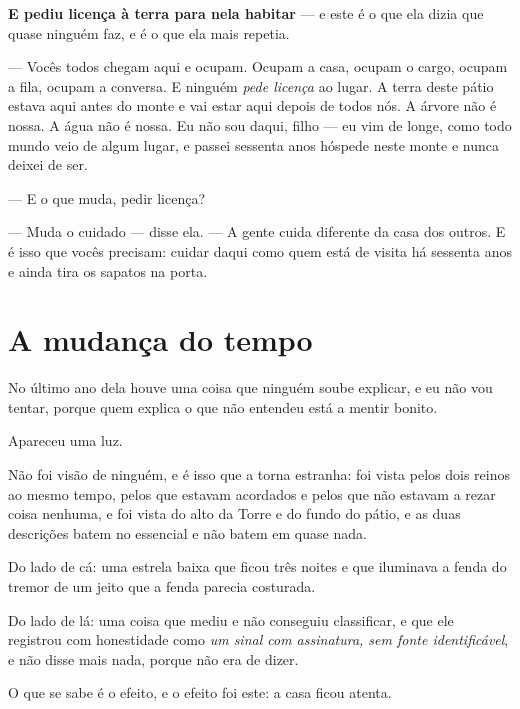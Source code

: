\documentclass[livro.tex]{subfiles}
\begin{document}
\textbf{E pediu licença à terra para nela habitar} --- e este é o que ela dizia que quase ninguém
faz, e é o que ela mais repetia.

\medskip

--- Vocês todos chegam aqui e ocupam. Ocupam a casa, ocupam o cargo, ocupam a fila, ocupam a
conversa. E ninguém \emph{pede licença} ao lugar. A terra deste pátio estava aqui antes do monte
e vai estar aqui depois de todos nós. A árvore não é nossa. A água não é nossa. Eu não sou daqui,
filho --- eu vim de longe, como todo mundo veio de algum lugar, e passei sessenta anos hóspede
neste monte e nunca deixei de ser.

--- E o que muda, pedir licença?

--- Muda o cuidado --- disse ela. --- A gente cuida diferente da casa dos outros. E é isso que
vocês precisam: cuidar daqui como quem está de visita há sessenta anos e ainda tira os sapatos na
porta.

\chapter{A mudança do tempo}

No último ano dela houve uma coisa que ninguém soube explicar, e eu não vou tentar,
porque quem explica o que não entendeu está a mentir bonito.

\medskip

Apareceu uma luz.

Não foi visão de ninguém, e é isso que a torna estranha: foi vista pelos dois reinos ao mesmo
tempo, pelos que estavam acordados e pelos que não estavam a rezar coisa nenhuma, e foi vista do
alto da Torre e do fundo do pátio, e as duas descrições batem no essencial e não batem em quase
nada.

Do lado de cá: uma estrela baixa que ficou três noites e que iluminava a fenda do tremor de um
jeito que a fenda parecia costurada.

Do lado de lá: uma coisa que \Drk mediu e não conseguiu classificar, e que ele registrou com
honestidade como \emph{um sinal com assinatura, sem fonte identificável}, e não disse mais nada,
porque não era de dizer.

\medskip

O que se sabe é o efeito, e o efeito foi este: a casa ficou atenta.
\end{document}
